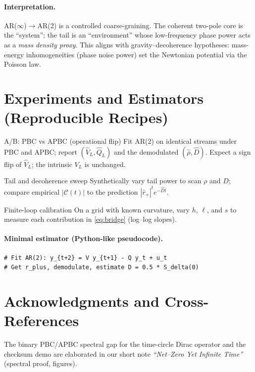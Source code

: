 \documentclass[11pt]{article}
\begin{document}
\paragraph{Interpretation.}
AR($\infty$)$\to$AR(2) is a controlled coarse-graining.
The coherent two-pole core is the ``system''; the tail is an ``environment'' whose low-frequency phase power acts as a \emph{mass density proxy}.
This aligns with gravity--decoherence hypotheses: mass-energy inhomogeneities (phase noise power) set the Newtonian potential via the Poisson law.

\section{Experiments and Estimators (Reproducible Recipes)}
\begin{mybox}{A/B: PBC vs APBC (operational flip)}
Fit AR(2) on identical streams under PBC and APBC; report $(\widehat V_L,\widehat Q_L)$ and the demodulated $(\widehat\rho,\widehat D)$.
Expect a sign flip of $\widehat V_L$; the intrinsic $V_L$ is unchanged.
\end{mybox}

\begin{mybox}{Tail and decoherence sweep}
Synthetically vary tail power to scan $\rho$ and $D$; compare empirical $|\mathcal C(t)|$ to the prediction $|\widehat r_+|^t e^{-\widehat D t}$.
\end{mybox}

\begin{mybox}{Finite-loop calibration}
On a grid with known curvature, vary $h$, $\ell$, and $s$ to measure each contribution in \eqref{eq:bridge} (log--log slopes). 
\end{mybox}

\paragraph{Minimal estimator (Python-like pseudocode).}
\begin{verbatim}
# Fit AR(2): y_{t+2} = V y_{t+1} - Q y_t + u_t
# Get r_plus, demodulate, estimate D = 0.5 * S_delta(0)
\end{verbatim}

\section*{Acknowledgments and Cross-References}
The binary PBC/APBC spectral gap for the time-circle Dirac operator and the checksum demo are elaborated in our short note \emph{``Net--Zero Yet Infinite Time''} (spectral proof, figures).
\end{document}
